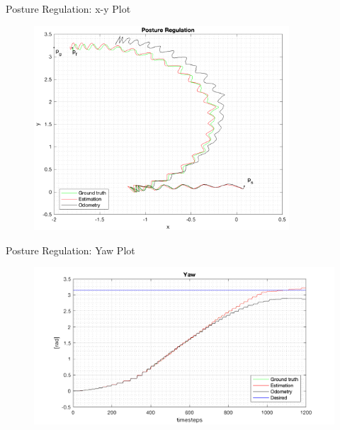 \documentclass[10pt]{beamer}
\begin{document}
    \begin{frame}{Posture Regulation: x-y Plot}
        \begin{figure}
            \includegraphics[width=0.85\textwidth]{images/posture_regulation.png}
        \end{figure}
    \end{frame}

    \begin{frame}{Posture Regulation: Yaw Plot}
        \begin{figure}
            \includegraphics[width=\textwidth]{images/yaw_postureregulation.png}
        \end{figure}
    \end{frame}
\end{document}

